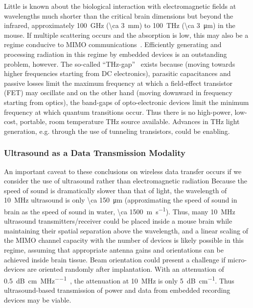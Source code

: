 Little is known about the biological interaction with electromagnetic fields at wavelengths much shorter than the critical brain dimensions but beyond the infrared, approximately \SI{100}{\giga\hertz} (\SI{\ca 3}{\milli\meter}) to \SI{100}{\tera\hertz} (\SI{\ca 3}{\micro\meter}) in the mouse.
If multiple scattering occurs and the absorption is low, this may also be a regime conducive to MIMO communications~\cite{bakopoulos09}.
Efficiently generating and processing radiation in this regime by embedded devices is an outstanding problem, however.
The so-called ``THz-gap''~\cite{tonouchi07} exists because (moving towards higher frequencies starting from DC electronics), parasitic capacitances and passive losses limit the maximum frequency at which a field-effect transistor (FET) may oscillate and on the other hand (moving downward in frequency starting from optics), the band-gaps of opto-electronic devices limit the minimum frequency at which quantum transitions occur.
Thus there is no high-power, low-cost, portable, room temperature \si{THz} source available.
Advances in \si{THz} light generation, e.g. through the use of tunneling transistors, could be enabling.

\subsubsection{Ultrasound as a Data Transmission Modality}
An important caveat to these conclusions on wireless data transfer occurs if we consider the use of ultrasound rather than electromagnetic radiation
Because the speed of sound is dramatically slower than that of light, the wavelength of \SI{10}{\mega\hertz} ultrasound is only \SI{\ca 150}{\micro\meter} (approximating the speed of sound in brain as the speed of sound in water, \SI{\ca 1500}{\meter\per\second}).
Thus, many \SI{10}{\mega\hertz} ultrasound transmitters/receiver could be placed inside a mouse brain while maintaining their spatial separation above the wavelength, and a linear scaling of the MIMO channel capacity with the number of devices is likely possible in this regime, assuming that appropriate antenna gains and orientations can be achieved inside brain tissue. Beam orientation could present a challenge if micro-devices are oriented randomly after implantation.
With an attenuation of \SI{0.5}{\dB\per\centi\meter\per\mega\hertz}~\cite{hoskins10}, the attenuation at \SI{10}{\mega\hertz} is only \SI{5}{\dB\per\centi\meter}.
Thus ultrasound-based transmission of power and data from embedded recording devices may be viable.

